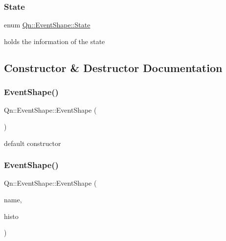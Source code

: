\subsubsection{\texorpdfstring{State}{State}}
{\footnotesize\ttfamily enum \mbox{\hyperlink{classQn_1_1EventShape_a5dce9f7b8a7fa7a8a663634ece8b7cb6}{Qn\+::\+Event\+Shape\+::\+State}}\hspace{0.3cm}{\ttfamily [strong]}}

holds the information of the state 

\subsection{Constructor \& Destructor Documentation}
\mbox{\label{classQn_1_1EventShape_ad24dc1e3b27a1a1b476d4e46f2374f9a}} 
\subsubsection{\texorpdfstring{Event\+Shape()}{EventShape()}\hspace{0.1cm}{\footnotesize\ttfamily [1/2]}}
{\footnotesize\ttfamily Qn\+::\+Event\+Shape\+::\+Event\+Shape (\begin{DoxyParamCaption}{ }\end{DoxyParamCaption})\hspace{0.3cm}{\ttfamily [default]}}

default constructor \mbox{\label{classQn_1_1EventShape_ac275147afb48e3eeb997626b8f7eac43}} 
\subsubsection{\texorpdfstring{Event\+Shape()}{EventShape()}\hspace{0.1cm}{\footnotesize\ttfamily [2/2]}}
{\footnotesize\ttfamily Qn\+::\+Event\+Shape\+::\+Event\+Shape (\begin{DoxyParamCaption}\item[{std\+::string}]{name,  }\item[{T\+H1F}]{histo }\end{DoxyParamCaption})\hspace{0.3cm}{\ttfamily [inline]}}

